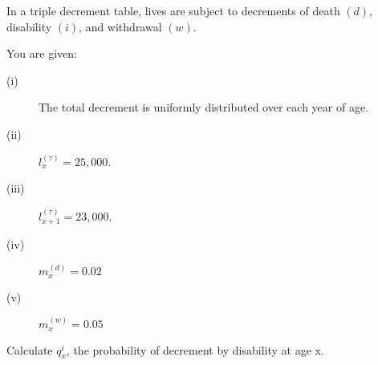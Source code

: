 In a triple decrement table, lives are subject to decrements of death $(d)$, 
disability $(i)$, and withdrawal $(w)$.

You are given:
\begin{description}
\item[(i)] The total decrement is uniformly distributed over each year of age.
\item[(ii)] $l_x^{(\tau)} = 25,000$.
\item[(iii)] $l_{x+1}^{(\tau)} = 23,000$.
\item[(iv)] $m_{x}^{(d)} = 0.02$
\item[(v)] $m_{x}^{(w)} = 0.05$
\end{description}
Calculate $q_x^{i}$, the probability of decrement by disability at age x.
\showsol{}
